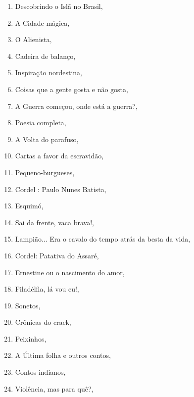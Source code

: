 \begin{multicols}{2}
\begin{enumerate}
\item Descobrindo o Islã no Brasil, {}
\item A Cidade mágica, {}
\item O Alienista, {}
\item Cadeira de balanço, {}
\item Inspiração nordestina, {}
\item Coisas que a gente gosta e não gosta, {}
\item A Guerra começou, onde está a guerra?, {}
\item Poesia completa, {}
\item A Volta do parafuso, {}
\item Cartas a favor da escravidão, {}
\item Pequeno-burgueses, {}
\item Cordel : Paulo Nunes Batista, {}
\item Esquimó, {}
\item Sai da frente, vaca brava!, {}
\item Lampião... Era o cavalo do tempo atrás da besta da vida, {}
\item Cordel: Patativa do Assaré, {}
\item Ernestine ou o nascimento do amor, {}
\item Filadélfia, lá vou eu!, {}
\item Sonetos, {}
\item Crônicas do crack, {}
\item Peixinhos, {}
\item A Última folha e outros contos, {}
\item Contos indianos, {}
\item Violência, mas para quê?, {}

\end{enumerate}
\end{multicols}
